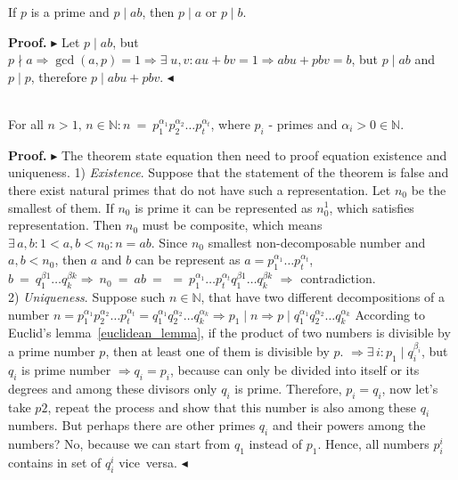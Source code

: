 \documentclass[../lecture-notes.tex]{subfiles}
\begin{document}
\begin{lemma} \label{euclidean_lemma}
    If $p$ is a prime and $p \mid ab$, then $p \mid a$ or $p \mid b$.
\end{lemma}

\textbf{Proof.} 
$\blacktriangleright$
Let $p \mid ab$, but $ p \nmid a \Rightarrow \gcd(a, p) = 1 \Rightarrow \exists \; u, v: au + bv = 1 \Rightarrow abu + pbv = b$, but $p \mid ab$ and $p \mid p$, therefore $p \mid abu + pbv$. 
$\blacktriangleleft$

\begin{theorem}
    \hfill \\ 
    For all $n > 1, \, n \in \mathbb{N}: n~=~p_{1}^{\alpha_1} p_{2}^{\alpha_2} \dots p_{t}^{\alpha_t}$, where $p_i$ - primes and $\alpha_i > 0 \in \mathbb{N}$.
\end{theorem}

\textbf{Proof.} 
$\blacktriangleright$  
The theorem state equation then need to proof equation existence and uniqueness.
1) \textit{Existence}. 
Suppose that the statement of the theorem is false and there exist natural primes that do not have such a representation.
Let $n_0$ be the smallest of them.
If $n_0$ is prime it can be represented as $n_{0}^{1}$, which satisfies representation. Then $n_0$ must be composite, which means $\exists \, a, b : 1 < a, b < n_0 : n = ab$.
Since $n_0$ smallest non-decomposable number and $a, b < n_0$, then $a$ and $b$ can be represent as 
$a = p_{1}^{\alpha_{1}} \dots p_{t}^{\alpha_{t}}$, 
$b~=~q_{1}^{\beta{1}} \dots q_{k}^{\beta{k}} 
\Rightarrow~n_0~=~ab~=$ $=~p_{1}^{\alpha_{1}} \dots p_{t}^{\alpha_{t}} q_{1}^{\beta{1}} \dots q_{k}^{\beta{k}}$
$\Rightarrow$ contradiction. \\
2) \textit{Uniqueness}. Suppose such $n \in \mathbb{N}$, that have two different decompositions of a number 
$n = p_{1}^{\alpha_1} p_{2}^{\alpha_2} \dots p_{t}^{\alpha_t} = q_{1}^{\alpha_1} q_{2}^{\alpha_2} \dots q_{k}^{\alpha_k}
\Rightarrow p_1 \mid n \Rightarrow p \mid q_{1}^{\alpha_1} q_{2}^{\alpha_2} \dots q_{k}^{\alpha_k}$ 
According to Euclid's lemma~\ref{euclidean_lemma}, if the product of two numbers is divisible by a prime number $p$, then at least one of them is divisible by $p$.
$\Rightarrow \exists \, i: p_1 \mid q_{i}^{\beta_i}$, but $q_i$ is prime number $\Rightarrow q_i = p_i$, because can only be divided into itself or its degrees and among these divisors only $q_i$ is prime. 
Therefore, $p_i  = q_i$, now let's take $p2$, repeat the process and show that this number is also among these $q_i$ numbers.
But perhaps there are other primes $q_i$ and their powers among the numbers? No, because we can start from $q_1$ instead of $p_1$.
Hence, all numbers $p_{i}^{i}$  contains in set of $q_{i}^{i}$ vice~versa.
$\blacktriangleleft$
\end{document}
